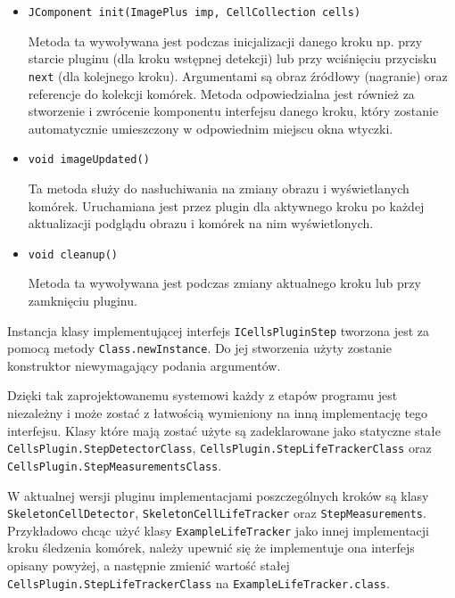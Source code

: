 \documentclass[declaration,shortabstract,mgr]{iithesis}
\begin{document}
\begin{itemize}

\item \texttt{JComponent init(ImagePlus imp, CellCollection cells)}

Metoda ta wywoływana jest podczas inicjalizacji danego kroku np. przy starcie pluginu (dla kroku wstępnej detekcji) lub przy wciśnięciu przycisku \texttt{next} (dla kolejnego kroku).
Argumentami są obraz źródłowy (nagranie) oraz referencje do kolekcji komórek.
Metoda odpowiedzialna jest również za stworzenie i zwrócenie komponentu interfejsu danego kroku, który zostanie automatycznie umieszczony w odpowiednim miejscu okna wtyczki.

\item \texttt{void imageUpdated()}

Ta metoda służy do nasłuchiwania na zmiany obrazu i wyświetlanych komórek.
Uruchamiana jest przez plugin dla aktywnego kroku po każdej aktualizacji podglądu obrazu i komórek na nim wyświetlonych.

\item \texttt{void cleanup()}

Metoda ta wywoływana jest podczas zmiany aktualnego kroku lub przy zamknięciu pluginu.

\end{itemize}

Instancja klasy implementującej interfejs \texttt{ICellsPluginStep} tworzona jest za pomocą metody \texttt{Class.newInstance}.
Do jej stworzenia użyty zostanie konstruktor niewymagający podania argumentów.

Dzięki tak zaprojektowanemu systemowi każdy z etapów programu jest niezależny i może zostać z łatwością wymieniony na inną implementację tego interfejsu.
Klasy które mają zostać użyte są zadeklarowane jako statyczne stałe \linebreak
\texttt{CellsPlugin.StepDetectorClass}, \texttt{CellsPlugin.StepLifeTrackerClass} oraz \linebreak
\texttt{CellsPlugin.StepMeasurementsClass}.

W aktualnej wersji pluginu implementacjami poszczególnych kroków są klasy \texttt{SkeletonCellDetector}, \texttt{SkeletonCellLifeTracker} oraz \texttt{StepMeasurements}.\linebreak
Przykładowo chcąc użyć klasy \texttt{ExampleLifeTracker} jako innej implementacji kroku śledzenia komórek, należy upewnić się że implementuje ona interfejs opisany powyżej, a następnie zmienić wartość stałej \texttt{CellsPlugin.StepLifeTrackerClass} na \texttt{ExampleLifeTracker.class}.
\end{document}
